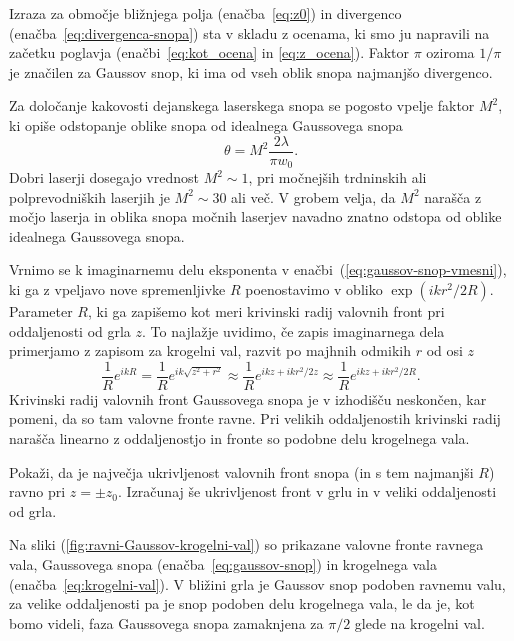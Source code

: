 Izraza za območje bližnjega polja (enačba~\ref{eq:z0}) in divergenco 
(enačba~\ref{eq:divergenca-snopa}) sta v skladu z ocenama, ki smo ju 
napravili na začetku poglavja (enačbi~\ref{eq:kot_ocena} in \ref{eq:z_ocena}). Faktor
$\pi$ oziroma $1/\pi$ je značilen za Gaussov snop, ki ima od vseh oblik snopa 
najmanjšo divergenco. 

\begin{remark}
Za določanje kakovosti dejanskega laserskega snopa se pogosto vpelje faktor $M^2$,
ki opiše odstopanje oblike snopa od idealnega Gaussovega snopa 
\begin{equation}
\theta = M^2 \frac{2\lambda}{\pi w_{0}}.
\label{faktorM}
\end{equation}
Dobri laserji dosegajo vrednost $M^2 \sim 1$,
pri močnejših trdninskih ali polprevodniških laserjih je $M^2 \sim 30$ ali več. 
V grobem velja, da $M^2$ narašča z močjo laserja in oblika snopa močnih laserjev navadno znatno
odstopa od oblike idealnega Gaussovega snopa.  
\end{remark}

Vrnimo se k imaginarnemu delu eksponenta v enačbi~(\ref{eq:gaussov-snop-vmesni}), ki ga
z vpeljavo nove spremenljivke $R$ poenostavimo v obliko $\exp(ikr^2/2R)$. Parameter $R$, ki 
ga zapišemo kot 
meri krivinski radij valovnih front 
pri oddaljenosti od grla $z$. To najlažje
uvidimo, če zapis imaginarnega dela primerjamo z zapisom za krogelni val, razvit 
po majhnih odmikih $r$ od osi
$z$
\begin{equation}
\frac{1}{R}e^{ikR}=\frac{1}{R}e^{ik\sqrt{z^{2}+r^{2}}}\approx \frac{1}{R}e^{ikz+ikr^{2}/2z} \approx \frac{1}{R}e^{ikz+ikr^{2}/2R}.
\label{eq:krogelni-val}
\end{equation}
Krivinski radij valovnih front Gaussovega snopa je v izhodišču neskončen, kar pomeni, da so tam valovne fronte 
ravne. Pri velikih oddaljenostih krivinski radij narašča linearno z oddaljenostjo in fronte
so podobne delu krogelnega vala. 

\begin{definition}
\label{naloga-ukrivljenost-snopa}
Pokaži, da je največja ukrivljenost valovnih front snopa (in s tem najmanjši $R$) ravno pri $z=\pm z_{0}$.
Izračunaj še ukrivljenost front v grlu in v veliki oddaljenosti od grla.
\end{definition}

Na sliki (\ref{fig:ravni-Gaussov-krogelni-val}) 
so prikazane valovne fronte ravnega vala, 
Gaussovega snopa (enačba~\ref{eq:gaussov-snop}) 
in krogelnega vala (enačba~\ref{eq:krogelni-val}). V bližini grla je
Gaussov snop podoben ravnemu valu, za velike oddaljenosti pa je snop 
podoben delu krogelnega vala, le da je, kot bomo videli, faza Gaussovega snopa 
zamaknjena za $\pi/2$ glede na krogelni val. 

